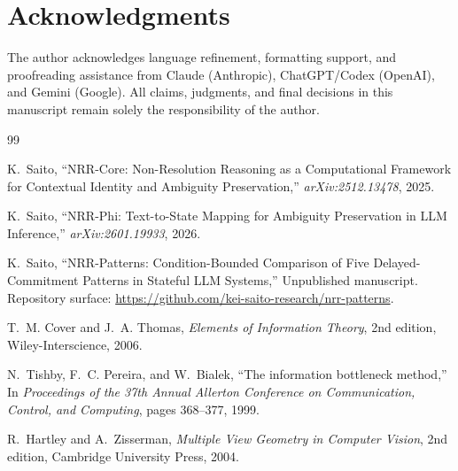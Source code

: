 \documentclass[11pt,a4paper]{article}
\begin{document}
\section*{Acknowledgments}

The author acknowledges language refinement, formatting support, and proofreading assistance from Claude (Anthropic), ChatGPT/Codex (OpenAI), and Gemini (Google). All claims, judgments, and final decisions in this manuscript remain solely the responsibility of the author.

\begin{thebibliography}{99}
\raggedright

K.~Saito,
\newblock ``NRR-Core: Non-Resolution Reasoning as a Computational Framework for Contextual Identity and Ambiguity Preservation,''
\newblock \emph{arXiv:2512.13478}, 2025.

K.~Saito,
\newblock ``NRR-Phi: Text-to-State Mapping for Ambiguity Preservation in LLM Inference,''
\newblock \emph{arXiv:2601.19933}, 2026.

K.~Saito,
\newblock ``NRR-Patterns: Condition-Bounded Comparison of Five Delayed-Commitment Patterns in Stateful LLM Systems,''
\newblock Unpublished manuscript. Repository surface:
\url{https://github.com/kei-saito-research/nrr-patterns}.

T.~M. Cover and J.~A. Thomas,
\newblock \emph{Elements of Information Theory},
\newblock 2nd edition, Wiley-Interscience, 2006.

N.~Tishby, F.~C. Pereira, and W.~Bialek,
\newblock ``The information bottleneck method,''
\newblock In \emph{Proceedings of the 37th Annual Allerton Conference on Communication, Control, and Computing}, pages 368--377, 1999.

R.~Hartley and A.~Zisserman,
\newblock \emph{Multiple View Geometry in Computer Vision},
\newblock 2nd edition, Cambridge University Press, 2004.

\end{thebibliography}
\end{document}
